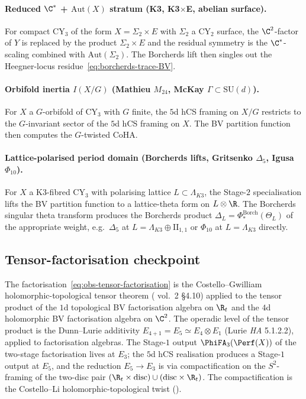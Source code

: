 \paragraph{Reduced $\C^*$ + $\mathrm{Aut}(X)$ stratum (K3, K3$\times$E, abelian surface).}
For compact CY$_3$ of the form $X = \Sigma_2\times E$ with $\Sigma_2$
a CY$_2$ surface, the $\C^2$-factor of $Y$ is replaced by the
product $\Sigma_2\times E$ and the residual symmetry is the $\C^*$-scaling
combined with $\mathrm{Aut}(\Sigma_2)$. The Borcherds lift then
singles out the Heegner-locus residue~\eqref{eq:borcherds-trace-BV}.

\paragraph{Orbifold inertia $I(X/G)$ (Mathieu $M_{24}$, McKay $\Gamma\subset\mathrm{SU}(d)$).}
For $X$ a $G$-orbifold of CY$_3$ with $G$ finite, the $5$d hCS
framing on $X/G$ restricts to the $G$-invariant sector of the
$5$d hCS framing on $X$. The BV partition function then computes the
$G$-twisted CoHA.

\paragraph{Lattice-polarised period domain (Borcherds lifts, Gritsenko $\Delta_5$, Igusa $\Phi_{10}$).}
For $X$ a K3-fibred CY$_3$ with polarising lattice $L\subset \Lambda_{K3}$,
the Stage-$2$ specialisation lifts the BV partition function to a
lattice-theta form on $L\otimes\R$. The Borcherds singular theta
transform produces the Borcherds product
$\Delta_L = \Phi^{\mathrm{Borch}}_*(\Theta_L)$ of the appropriate
weight, e.g.\ $\Delta_5$ at $L = \Lambda_{K3}\oplus\mathrm{II}_{1,1}$
or $\Phi_{10}$ at $L = \Lambda_{K3}$ directly.

\subsection*{Tensor-factorisation checkpoint}

The factorisation~\eqref{eq:obs-tensor-factorisation} is the
Costello--Gwilliam holomorphic-topological tensor theorem
(\cite{CostelloGwilliam} vol.~2 §4.10) applied to the tensor product
of the $1$d topological BV factorisation algebra on $\R_t$ and the
$4$d holomorphic BV factorisation algebra on $\C^2$. The operadic
level of the tensor product is the Dunn--Lurie additivity
$E_{4+1} = E_5 \simeq E_4\otimes E_1$ (Lurie \emph{HA} 5.1.2.2),
applied to factorisation algebras. The Stage-$1$ output
$\PhiFA_3(\Perf(X))$ of the two-stage factorisation lives at
$E_3$; the $5$d hCS realisation produces a Stage-$1$ output at
$E_5$, and the reduction $E_5 \to E_3$ is via compactification on
the $S^2$-framing of the two-disc pair
$(\R_t \times \mathrm{disc})\cup (\mathrm{disc}\times\R_t)$. The
compactification is the Costello--Li holomorphic-topological twist
(\cite{CostelloLi2020}).


